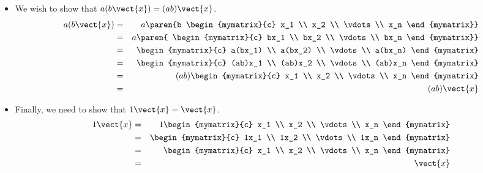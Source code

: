 \begin{solution}
\begin{itemize}
\item
We wish to show that $a(b\vect{x}) = (ab) \vect{x}$. 
\begin{eqnarray*}
a(b\vect{x}) &=& 
a\paren{b \begin{mymatrix}{c}
x_1 \\
x_2 \\
\vdots \\
x_n
\end{mymatrix}} \\
&=& a\paren{
\begin{mymatrix}{c}
bx_1 \\
bx_2 \\
\vdots \\
bx_n
\end{mymatrix}} \\
&=&
\begin{mymatrix}{c}
a(bx_1) \\
a(bx_2) \\
\vdots \\
a(bx_n)
\end{mymatrix} \\
&=&
\begin{mymatrix}{c}
(ab)x_1 \\
(ab)x_2 \\
\vdots \\
(ab)x_n
\end{mymatrix} \\
&=& (ab)
\begin{mymatrix}{c}
x_1 \\
x_2 \\
\vdots \\
x_n
\end{mymatrix} \\
&=& (ab)\vect{x}
\end{eqnarray*}

\item
Finally, we need to show that $1\vect{x} = \vect{x}$.
\begin{eqnarray*}
1\vect{x} &=& 1 \begin{mymatrix}{c}
x_1 \\
x_2 \\
\vdots \\
x_n
\end{mymatrix} \\
&=&
\begin{mymatrix}{c}
1x_1 \\
1x_2 \\
\vdots \\
1x_n
\end{mymatrix} \\
&=& 
\begin{mymatrix}{c}
x_1 \\
x_2 \\
\vdots \\
x_n
\end{mymatrix} \\
&=& \vect{x}
\end{eqnarray*}
\end{itemize}


\end{solution}
